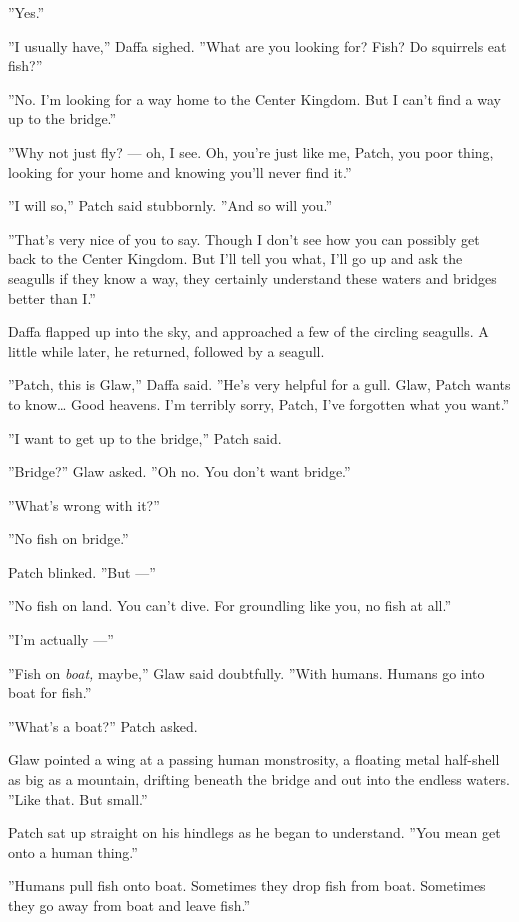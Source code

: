 \documentclass[12pt]{book}
\begin{document}
''Yes.''

''I usually have,'' Daffa sighed. ''What are you looking for? Fish? Do
squirrels eat fish?''

''No. I'm looking for a way home to the Center Kingdom. But I can't
find a way up to the bridge.''

''Why not just fly? --- oh, I see. Oh, you're just like me, Patch, you
poor thing, looking for your home and knowing you'll never find it.''

''I will so,'' Patch said stubbornly. ''And so will you.''

''That's very nice of you to say. Though I don't see how you can
possibly get back to the Center Kingdom. But I'll tell you what, I'll
go up and ask the seagulls if they know a way, they certainly
understand these waters and bridges better than I.''

Daffa flapped up into the sky, and approached a few of the circling
seagulls. A little while later, he returned, followed by a seagull.

''Patch, this is Glaw,'' Daffa said. ''He's very helpful for a
gull. Glaw, Patch wants to know\ldots{} Good heavens. I'm terribly
sorry, Patch, I've forgotten what you want.''

''I want to get up to the bridge,'' Patch said.

''Bridge?'' Glaw asked. ''Oh no. You don't want bridge.''

''What's wrong with it?''

''No fish on bridge.''

Patch blinked. ''But ---''

''No fish on land. You can't dive. For groundling like you, no fish at
all.''

''I'm actually ---''

''Fish on \textit{boat,} maybe,'' Glaw said doubtfully. ''With
humans. Humans go into boat for fish.''

''What's a boat?'' Patch asked.

Glaw pointed a wing at a passing human monstrosity, a floating metal
half-shell as big as a mountain, drifting beneath the bridge and out
into the endless waters. ''Like that. But small.''

Patch sat up straight on his hindlegs as he began to understand. ''You
mean get onto a human thing.''

''Humans pull fish onto boat. Sometimes they drop fish from
boat. Sometimes they go away from boat and leave fish.''
\end{document}
